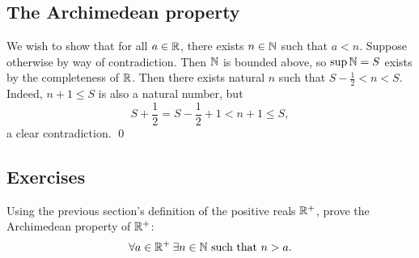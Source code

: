 \documentclass[master.tex]{subfiles}
\begin{document}
    \subsection{The Archimedean property}
    We wish to show that for all $a \in \mathbb{R}$, there exists $n \in \mathbb{N}$ such that $a < n$.
    Suppose otherwise by way of contradiction.
    Then $\mathbb{N}$ is bounded above, so $\sup{\mathbb{N}} = S$ exists by the completeness of $\mathbb{R}$.
    Then there exists natural $n$ such that $S - \frac{1}{2} < n < S$.
    Indeed, $n + 1 \leq S$ is also a natural number, but
    \[
        S + \frac{1}{2} = S - \frac{1}{2} + 1 < n + 1 \leq S
    ,\]
    a clear contradiction. \qed


    \subsection*{Exercises}
    \begin{exercises}
        \item Using the previous section's definition of the positive reals $\mathbb{R}^{+}$, prove the Archimedean property of $\mathbb{R}^{+}$:
        \[
            \forall a \in \mathbb{R}^{+} \: \exists n \in \mathbb{N} \text{ such that } n > a
        .\]
    \end{exercises}
\end{document}
